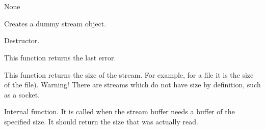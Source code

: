 \section{}\label{wxstreambase}


None







Creates a dummy stream object.



Destructor.



This function returns the last error.


This function returns the size of the stream. For example, for a file it is the size of
the file). Warning! There are streams which do not have size by definition, such as a socket.

\label{wxstreambaseonsysread}


Internal function. It is called when the stream buffer needs a buffer of the
specified size. It should return the size that was actually read.



